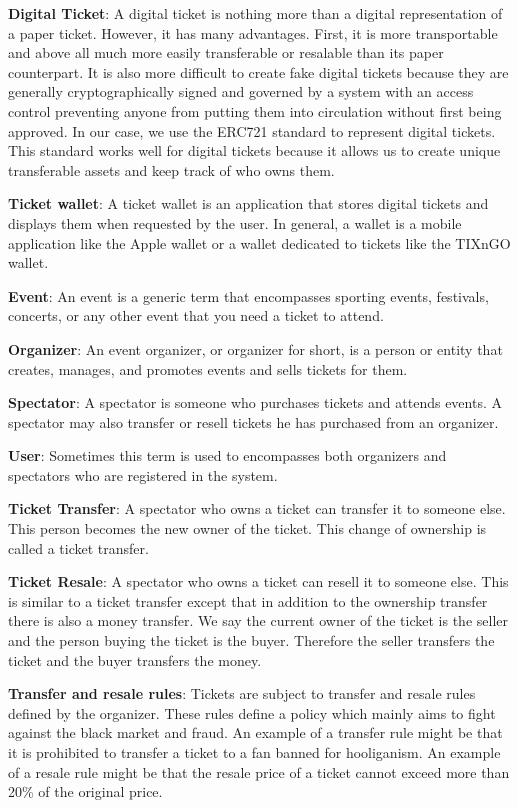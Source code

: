 \documentclass[a4paper,11pt,oneside]{report}
\begin{document}
\begin{description} 
    \item \textbf{Digital Ticket}: A digital ticket is nothing more than a digital representation of a paper ticket. However, it has many advantages. First, it is more transportable and above all much more easily transferable or resalable than its paper counterpart. It is also more difficult to create fake digital tickets because they are generally cryptographically signed and governed by a system with an access control preventing anyone from putting them into circulation without first being approved. In our case, we use the ERC721 standard to represent digital tickets. This standard works well for digital tickets because it allows us to create unique transferable assets and keep track of who owns them.
    \item \textbf{Ticket wallet}: A ticket wallet is an application that stores digital tickets and displays them when requested by the user. In general, a wallet is a mobile application like the Apple wallet or a wallet dedicated to tickets like the TIXnGO wallet.
    \item \textbf{Event}: An event is a generic term that encompasses sporting events, festivals, concerts, or any other event that you need a ticket to attend.
    \item \textbf{Organizer}: An event organizer, or organizer for short, is a person or entity that creates, manages, and promotes events and sells tickets for them.
    \item \textbf{Spectator}: A spectator is someone who purchases tickets and attends events. A spectator may also transfer or resell tickets he has purchased from an organizer.
    \item \textbf{User}: Sometimes this term is used to encompasses both organizers and spectators who are registered in the system.
    \item \textbf{Ticket Transfer}: A spectator who owns a ticket can transfer it to someone else. This person becomes the new owner of the ticket. This change of ownership is called a ticket transfer.
    \item \textbf{Ticket Resale}: A spectator who owns a ticket can resell it to someone else. This is similar to a ticket transfer except that in addition to the ownership transfer there is also a money transfer. We say the current owner of the ticket is the seller and the person buying the ticket is the buyer. Therefore the seller transfers the ticket and the buyer transfers the money.
    \item \textbf{Transfer and resale rules}: Tickets are subject to transfer and resale rules defined by the organizer. These rules define a policy which mainly aims to fight against the black market and fraud. An example of a transfer rule might be that it is prohibited to transfer a ticket to a fan banned for hooliganism. An example of a resale rule might be that the resale price of a ticket cannot exceed more than 20\% of the original price.

\end{description}
\end{document}
